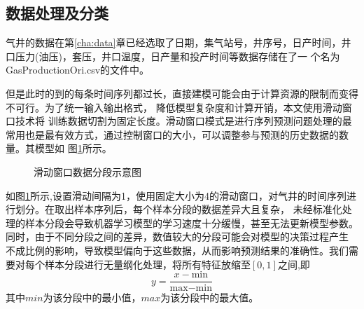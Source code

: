 \subsection{数据处理及分类}
\label{sec:datafoc}
气井的数据在第\ref{cha:data}章已经选取了日期，集气站号，井序号，日产时间，井口压力(油压)，套压，井口温度，日产量和投产时间等数据存储在了一
个名为GasProductionOri.csv的文件中。

但是此时的到的每条时间序列都过长，直接建模可能会由于计算资源的限制而变得不可行。为了统一输入输出格式，
降低模型复杂度和计算开销，本文使用滑动窗口技术将
训练数据切割为固定长度。滑动窗口模式是进行序列预测问题处理的最常用也是最有效方式，通过控制窗口的大小，可以调整参与预测的历史数据的数量。其模型如
图\ref{fig:slidewindow}所示。
\begin{figure}[H]
    \label{fig:slidewindow}
    \caption{滑动窗口数据分段示意图}
\end{figure}
如图\ref{fig:slidewindow}所示,设置滑动间隔为1，使用固定大小为4的滑动窗口，对气井的时间序列进行划分。在取出样本序列后，每个样本分段的数据差异大且复杂，
未经标准化处理的样本分段会导致机器学习模型的学习速度十分缓慢，甚至无法更新模型参数。同时，由于不同分段之间的差异，数值较大的分段可能会对模型的决策过程产生
不成比例的影响，导致模型偏向于这些数据，从而影响预测结果的准确性。我们需要对每个样本分段进行无量纲化处理，将所有特征放缩至$[0,1]$之间,即
\begin{equation}
    y = \frac{x - \text{min}}{\text{max} - \text{min}}
\end{equation}
其中$min$为该分段中的最小值，$max$为该分段中的最大值。

